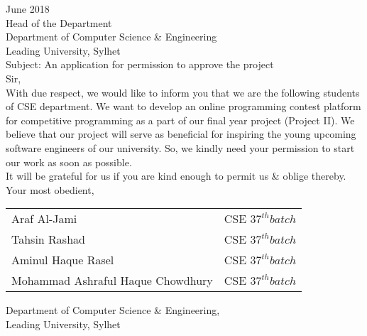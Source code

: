 \pagestyle{empty}
 June 2018\\
Head of the Department\\
Department of Computer Science \& Engineering\\
Leading University, Sylhet\\

\noindent Subject: An application for permission to approve the project \\

\noindent Sir, \\
\noindent With due respect, we would like to inform you that we are the following students of CSE department. We want to develop an online programming contest platform for competitive programming as a part of our final year project (Project II). We believe that our project will serve as beneficial for inspiring the young upcoming software engineers of our university. So, we kindly need your permission to start our work as soon as possible. \\
\newline
It will be grateful for us if you are kind enough to permit us \& oblige thereby. \\

\noindent Your most obedient, \\

    \begin{tabular}{l c}
         Araf Al-Jami & CSE $37^{th} batch$ \\
         Tahsin Rashad & CSE $37^{th} batch$ \\
         Aminul Haque Rasel & CSE $37^{th} batch$ \\
         Mohammad Ashraful Haque Chowdhury & CSE $37^{th} batch$ \\

    \end{tabular}

\vspace{20pt}

\noindent Department of Computer Science \& Engineering, \\
Leading University, Sylhet \\

\pagebreak

